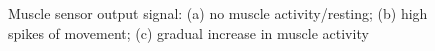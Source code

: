 \documentclass[12pt,scrartcl,titlepage]{article}
\begin{document}
\begin{figure}[h!]
  \begin{minipage}{.5\linewidth}
    \centering
  \end{minipage}%
  \begin{minipage}{.5\linewidth}
    \centering
  \end{minipage}\par\medskip
  \centering
  \begin{center}
    \caption{Muscle sensor output signal: (a) no muscle activity/resting; (b) high spikes of movement; (c) gradual increase in muscle activity}
  \end{center}
\end{figure}
\end{document}
